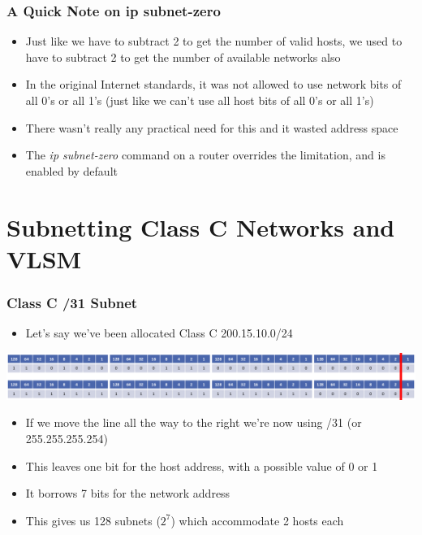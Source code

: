 \documentclass[pdflatex,compress]{beamer}
\begin{document}
\begin{frame}
	\frametitle{A Quick Note on ip subnet-zero}
	\begin{itemize}
		\item Just like we have to subtract 2 to get the number of valid hosts, we used to have to subtract 2 to get the number of available networks also
		\item In the original Internet standards, it was not allowed to use network bits of all 0's or all 1's (just like we can't use all host bits of all 0's or all 1's)
		\item There wasn't really any practical need for this and it wasted address space
		\item The \textit{ip subnet-zero} command on a router overrides the limitation, and is enabled by default
	\end{itemize}
\end{frame}

\section{Subnetting Class C Networks and VLSM}

\begin{frame}
	\frametitle{Class C /31 Subnet}
	\begin{itemize}
		\item Let's say we've been allocated Class C 200.15.10.0/24
	\end{itemize}
	\begin{center}
		\includegraphics[width=1\linewidth]{img/img03}
	\end{center}
	\begin{itemize}
		\item If we move the line all the way to the right we're now using /31 (or 255.255.255.254)
		\item This leaves one bit for the host address, with a possible value of 0 or 1
		\item It borrows 7 bits for the network address
		\item This gives us 128 subnets ($ 2^7 $) which accommodate 2 hosts each
	\end{itemize}
\end{frame}
\end{document}
